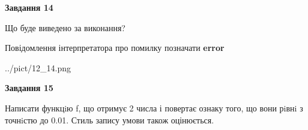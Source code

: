 \documentclass[11pt, ukrainian]{article}
\begin{document}
{\begin {large}
{\begin {center}\textbf{Завдання 14}\end {center}}\par
Що буде виведено за виконання? \par
Повідомлення інтерпретатора про помилку позначати \textbf{error}

\begin{center}
	{../pict/12_14.png}
\end{center}
\newpage

{\begin {center}\textbf{Завдання 15}\end {center}}\par

Написати функцiю f, що отримує 2 числа і повертає ознаку того, що вони рiвнi з точнiстю до 0.01. Стиль запису умови також оцінюється.\par
\newpage

\end {large}}
\end{document}
